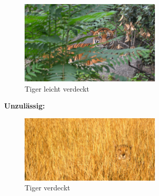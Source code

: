 \begin{figure}[htbp]
	\centering
		\includegraphics[width=0.60\textwidth]{BilderPDF/zielsetzung/tiger_03.jpg}
	\caption{Tiger leicht verdeckt \cite{tiger_leicht_verdeckt}}
	\label{fig:tiger_03}
\end{figure}

\vspace{5cm}

\textbf{Unzulässig:}

\begin{figure}[htbp]
	\centering
		\includegraphics[width=0.60\textwidth]{BilderPDF/zielsetzung/tiger_04.jpg}
	\caption{Tiger verdeckt \cite{tiger_verdeckt}}
	\label{fig:tiger_04}
\end{figure}

\newpage